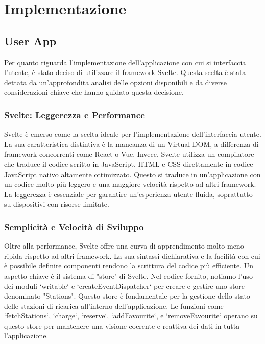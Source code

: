 

\section{Implementazione}\label{sec:implementazione}


\subsection{User App}

Per quanto riguarda l'implementazione dell'applicazione con cui si interfaccia l'utente, è stato deciso di utilizzare il framework Svelte. Questa scelta è stata dettata da un'approfondita analisi delle opzioni disponibili e da diverse considerazioni chiave che hanno guidato questa decisione.

\subsubsection{Svelte: Leggerezza e Performance}

Svelte è emerso come la scelta ideale per l'implementazione dell'interfaccia utente. La sua caratteristica distintiva è la mancanza di un Virtual DOM, a differenza di framework concorrenti come React o Vue. Invece, Svelte utilizza un compilatore che traduce il codice scritto in JavaScript, HTML e CSS direttamente in codice JavaScript nativo altamente ottimizzato. Questo si traduce in un'applicazione con un codice molto più leggero e una maggiore velocità rispetto ad altri framework. La leggerezza è essenziale per garantire un'esperienza utente fluida, soprattutto su dispositivi con risorse limitate.

\subsubsection{Semplicità e Velocità di Sviluppo}

Oltre alla performance, Svelte offre una curva di apprendimento molto meno ripida rispetto ad altri framework. La sua sintassi dichiarativa e la facilità con cui è possibile definire componenti rendono la scrittura del codice più efficiente. Un aspetto chiave è il sistema di "store" di Svelte. Nel codice fornito, notiamo l'uso dei moduli `writable` e `createEventDispatcher` per creare e gestire uno store denominato "Stations". Questo store è fondamentale per la gestione dello stato delle stazioni di ricarica all'interno dell'applicazione. Le funzioni come `fetchStations`, `charge`, `reserve`, `addFavourite`, e `removeFavourite` operano su questo store per mantenere una visione coerente e reattiva dei dati in tutta l'applicazione.


